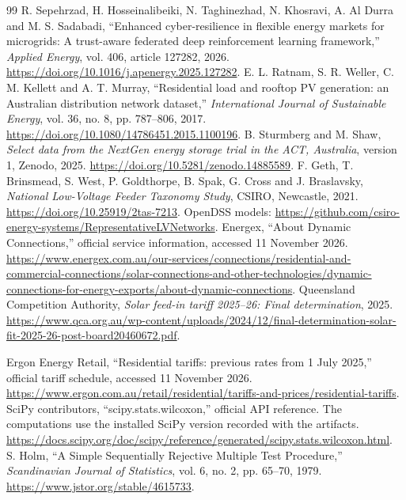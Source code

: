 \begin{thebibliography}{99}
 R. Sepehrzad, H. Hosseinalibeiki, N. Taghinezhad, N. Khosravi, A. Al Durra and M. S. Sadabadi, ``Enhanced cyber-resilience in flexible energy markets for microgrids: A trust-aware federated deep reinforcement learning framework,'' \emph{Applied Energy}, vol. 406, article 127282, 2026. \url{https://doi.org/10.1016/j.apenergy.2025.127282}.
 E. L. Ratnam, S. R. Weller, C. M. Kellett and A. T. Murray, ``Residential load and rooftop PV generation: an Australian distribution network dataset,'' \emph{International Journal of Sustainable Energy}, vol. 36, no. 8, pp. 787--806, 2017. \url{https://doi.org/10.1080/14786451.2015.1100196}.
 B. Sturmberg and M. Shaw, \emph{Select data from the NextGen energy storage trial in the ACT, Australia}, version 1, Zenodo, 2025. \url{https://doi.org/10.5281/zenodo.14885589}.
 F. Geth, T. Brinsmead, S. West, P. Goldthorpe, B. Spak, G. Cross and J. Braslavsky, \emph{National Low-Voltage Feeder Taxonomy Study}, CSIRO, Newcastle, 2021. \url{https://doi.org/10.25919/2tas-7213}. OpenDSS models: \url{https://github.com/csiro-energy-systems/RepresentativeLVNetworks}.
 Energex, ``About Dynamic Connections,'' official service information, accessed 11 November 2026. \url{https://www.energex.com.au/our-services/connections/residential-and-commercial-connections/solar-connections-and-other-technologies/dynamic-connections-for-energy-exports/about-dynamic-connections}.
 Queensland Competition Authority, \emph{Solar feed-in tariff 2025--26: Final determination}, 2025. \url{https://www.qca.org.au/wp-content/uploads/2024/12/final-determination-solar-fit-2025-26-post-board20460672.pdf}.

 Ergon Energy Retail, ``Residential tariffs: previous rates from 1 July 2025,'' official tariff schedule, accessed 11 November 2026. \url{https://www.ergon.com.au/retail/residential/tariffs-and-prices/residential-tariffs}.
 SciPy contributors, ``scipy.stats.wilcoxon,'' official API reference. The computations use the installed SciPy version recorded with the artifacts. \url{https://docs.scipy.org/doc/scipy/reference/generated/scipy.stats.wilcoxon.html}.
 S. Holm, ``A Simple Sequentially Rejective Multiple Test Procedure,'' \emph{Scandinavian Journal of Statistics}, vol. 6, no. 2, pp. 65--70, 1979. \url{https://www.jstor.org/stable/4615733}.
\end{thebibliography}
